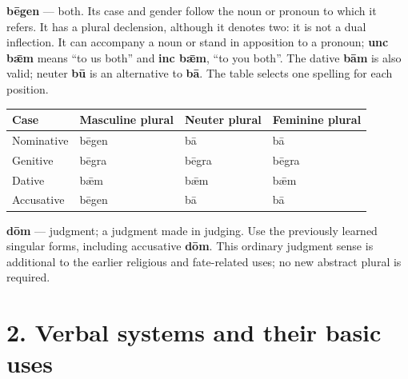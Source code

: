 \par\begin{minipage}{\linewidth}\raggedright
\textbf{bēgen} — both. Its case and gender follow the noun or pronoun to which it refers. It has a plural declension, although it denotes two: it is not a dual inflection. It can accompany a noun or stand in apposition to a pronoun; \textbf{unc bǣm} means “to us both” and \textbf{inc bǣm}, “to you both”. The dative \textbf{bām} is also valid; neuter \textbf{bū} is an alternative to \textbf{bā}. The table selects one spelling for each position.

\par\begingroup
\fontsize{10.5}{13.2}\selectfont
\setlength{\LTleft}{0pt}\setlength{\LTright}{\fill}
\noindent
\begin{tabular}{@{}>{\raggedright\arraybackslash}p{22.0mm}>{\raggedright\arraybackslash}p{31.188mm}>{\raggedright\arraybackslash}p{31.188mm}>{\raggedright\arraybackslash}p{31.188mm}@{}}
\toprule
\textbf{Case} & \textbf{Masculine plural} & \textbf{Neuter plural} & \textbf{Feminine plural} \\
\midrule
Nominative & bēgen & bā & bā \\
Genitive & bēgra & bēgra & bēgra \\
Dative & bǣm & bǣm & bǣm \\
Accusative & bēgen & bā & bā \\
\bottomrule
\end{tabular}
\par\endgroup
\end{minipage}\par
\textbf{dōm} — judgment; a judgment made in judging. Use the previously learned singular forms, including accusative \textbf{dōm}. This ordinary judgment sense is additional to the earlier religious and fate-related uses; no new abstract plural is required.

\section*{2. Verbal systems and their basic uses}

